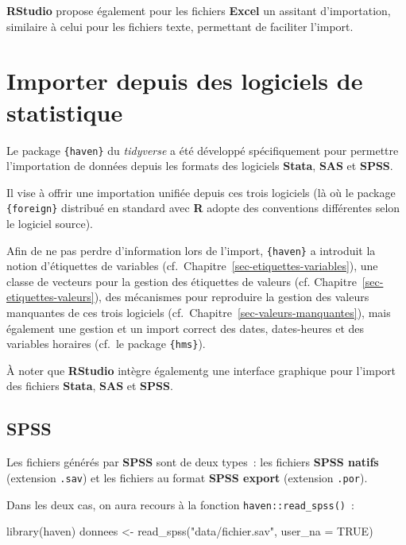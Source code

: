 \documentclass[
  letterpaper,
  DIV=11,
  numbers=noendperiod,
  oneside]{scrreprt}
\newenvironment{Shaded}{\begin{snugshade}}{\end{snugshade}}
\newcommand{\AttributeTok}[1]{\textcolor[rgb]{0.40,0.45,0.13}{#1}}
\newcommand{\ConstantTok}[1]{\textcolor[rgb]{0.56,0.35,0.01}{#1}}
\newcommand{\FunctionTok}[1]{\textcolor[rgb]{0.28,0.35,0.67}{#1}}
\newcommand{\NormalTok}[1]{\textcolor[rgb]{0.00,0.23,0.31}{#1}}
\newcommand{\OtherTok}[1]{\textcolor[rgb]{0.00,0.23,0.31}{#1}}
\newcommand{\StringTok}[1]{\textcolor[rgb]{0.13,0.47,0.30}{#1}}
\begin{document}
\textbf{RStudio} propose également pour les fichiers \textbf{Excel} un
assitant d'importation, similaire à celui pour les fichiers texte,
permettant de faciliter l'import.

\hypertarget{importer-depuis-des-logiciels-de-statistique}{%
\section{Importer depuis des logiciels de
statistique}\label{importer-depuis-des-logiciels-de-statistique}}

Le package \texttt{\{haven\}} du \emph{tidyverse} a été développé
spécifiquement pour permettre l'importation de données depuis les
formats des logiciels \textbf{Stata}, \textbf{SAS} et \textbf{SPSS}.

Il vise à offrir une importation unifiée depuis ces trois logiciels (là
où le package \texttt{\{foreign\}} distribué en standard avec \textbf{R}
adopte des conventions différentes selon le logiciel source).

Afin de ne pas perdre d'information lors de l'import, \texttt{\{haven\}}
a introduit la notion d'étiquettes de variables
(cf.~Chapitre~\ref{sec-etiquettes-variables}), une classe de vecteurs
pour la gestion des étiquettes de valeurs (cf.
Chapitre~\ref{sec-etiquettes-valeurs}), des mécanismes pour reproduire
la gestion des valeurs manquantes de ces trois logiciels
(cf.~Chapitre~\ref{sec-valeurs-manquantes}), mais également une gestion
et un import correct des dates, dates-heures et des variables horaires
(cf.~le package \texttt{\{hms\}}).

À noter que \textbf{RStudio} intègre égalementg une interface graphique
pour l'import des fichiers \textbf{Stata}, \textbf{SAS} et
\textbf{SPSS}.

\hypertarget{spss}{%
\subsection{SPSS}\label{spss}}

Les fichiers générés par \textbf{SPSS} sont de deux types~: les fichiers
\textbf{SPSS natifs} (extension \texttt{.sav}) et les fichiers au format
\textbf{SPSS export} (extension \texttt{.por}).

Dans les deux cas, on aura recours à la fonction
\texttt{haven::read\_spss()}~:

\begin{Shaded}
\begin{Highlighting}[]
\FunctionTok{library}\NormalTok{(haven)}
\NormalTok{donnees }\OtherTok{\textless{}{-}} \FunctionTok{read\_spss}\NormalTok{(}\StringTok{"data/fichier.sav"}\NormalTok{, }\AttributeTok{user\_na =} \ConstantTok{TRUE}\NormalTok{)}
\end{Highlighting}
\end{Shaded}
\end{document}
